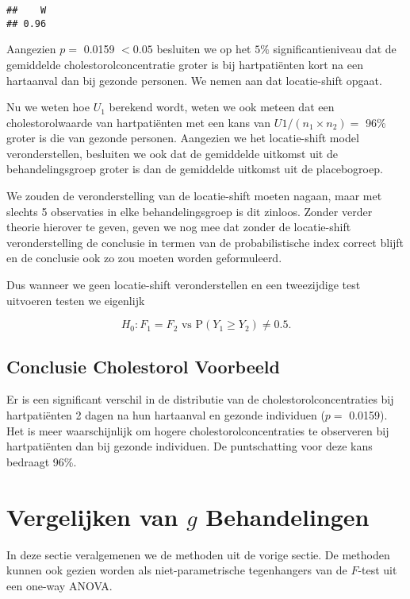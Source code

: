 \documentclass[12pt,dutch,coursenotes]{book}
\theoremstyle{definition}
\theoremstyle{definition}
\theoremstyle{definition}
\theoremstyle{remark}
\begin{document}
\begin{verbatim}
##    W 
## 0.96
\end{verbatim}

Aangezien \(p=\) 0.0159 \(<0.05\) besluiten we op het \(5\%\)
significantieniveau dat de gemiddelde cholestorolconcentratie groter is
bij hartpatiënten kort na een hartaanval dan bij gezonde personen. We
nemen aan dat locatie-shift opgaat.

Nu we weten hoe \(U_1\) berekend wordt, weten we ook meteen dat een
cholestorolwaarde van hartpatiënten met een kans van
\(U1/(n_1\times n_2)=\) 96\% groter is die van gezonde personen.
Aangezien we het locatie-shift model veronderstellen, besluiten we ook
dat de gemiddelde uitkomst uit de behandelingsgroep groter is dan de
gemiddelde uitkomst uit de placebogroep.

We zouden de veronderstelling van de locatie-shift moeten nagaan, maar
met slechts 5 observaties in elke behandelingsgroep is dit zinloos.
Zonder verder theorie hierover te geven, geven we nog mee dat zonder de
locatie-shift veronderstelling de conclusie in termen van de
probabilistische index correct blijft en de conclusie ook zo zou moeten
worden geformuleerd.

Dus wanneer we geen locatie-shift veronderstellen en een tweezijdige
test uitvoeren testen we eigenlijk

\[H_0: F_1=F_2 \text{ vs P}(Y_1 \geq Y_2) \neq 0.5.\]

\subsection{Conclusie Cholestorol
Voorbeeld}\label{conclusie-cholestorol-voorbeeld}

Er is een significant verschil in de distributie van de
cholestorolconcentraties bij hartpatiënten 2 dagen na hun hartaanval en
gezonde individuen (\(p=\) 0.0159). Het is meer waarschijnlijk om hogere
cholestorolconcentraties te observeren bij hartpatiënten dan bij gezonde
individuen. De puntschatting voor deze kans bedraagt 96\%.

\section{\texorpdfstring{Vergelijken van \(g\)
Behandelingen}{Vergelijken van g Behandelingen}}\label{vergelijken-van-g-behandelingen}

In deze sectie veralgemenen we de methoden uit de vorige sectie. De
methoden kunnen ook gezien worden als niet-parametrische tegenhangers
van de \(F\)-test uit een one-way ANOVA.
\end{document}
